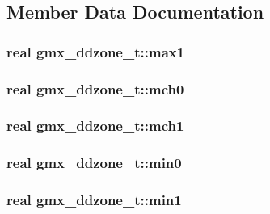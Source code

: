 \subsection{\-Member \-Data \-Documentation}
\hypertarget{structgmx__ddzone__t_a21fec24a423a579f68c96784cd9ed021}{
\subsubsection[{max1}]{\setlength{\rightskip}{0pt plus 5cm}real {\bf gmx\-\_\-ddzone\-\_\-t\-::max1}}}\label{structgmx__ddzone__t_a21fec24a423a579f68c96784cd9ed021}
\hypertarget{structgmx__ddzone__t_af10e3c9a351dcb4a7a706d7ae1289a0d}{
\subsubsection[{mch0}]{\setlength{\rightskip}{0pt plus 5cm}real {\bf gmx\-\_\-ddzone\-\_\-t\-::mch0}}}\label{structgmx__ddzone__t_af10e3c9a351dcb4a7a706d7ae1289a0d}
\hypertarget{structgmx__ddzone__t_ac64222dda1caa291213bdf1eb18cf3c6}{
\subsubsection[{mch1}]{\setlength{\rightskip}{0pt plus 5cm}real {\bf gmx\-\_\-ddzone\-\_\-t\-::mch1}}}\label{structgmx__ddzone__t_ac64222dda1caa291213bdf1eb18cf3c6}
\hypertarget{structgmx__ddzone__t_a0cb27e12d6358e4b5def529ef3584c32}{
\subsubsection[{min0}]{\setlength{\rightskip}{0pt plus 5cm}real {\bf gmx\-\_\-ddzone\-\_\-t\-::min0}}}\label{structgmx__ddzone__t_a0cb27e12d6358e4b5def529ef3584c32}
\hypertarget{structgmx__ddzone__t_a0ed2cb1e7a546672318dddb5eef35e65}{
\subsubsection[{min1}]{\setlength{\rightskip}{0pt plus 5cm}real {\bf gmx\-\_\-ddzone\-\_\-t\-::min1}}}\label{structgmx__ddzone__t_a0ed2cb1e7a546672318dddb5eef35e65}
